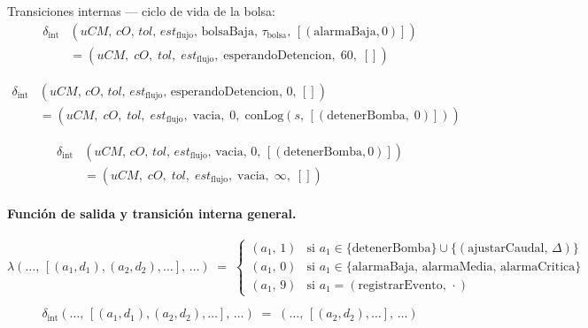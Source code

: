 Transiciones internas — ciclo de vida de la bolsa:
\begin{align*}
  \delta_{\mathrm{int}}&(uCM,\,cO,\,tol,\,est_{\mathrm{flujo}},\,
    \mathrm{bolsaBaja},\,\tau_{\mathrm{bolsa}},\,[(\mathrm{alarmaBaja},0)]) \\
  &= (uCM,\;cO,\;tol,\;est_{\mathrm{flujo}},\;
      \mathrm{esperandoDetencion},\;60,\;[])
\end{align*}

\begin{align*}
  \delta_{\mathrm{int}}&(uCM,\,cO,\,tol,\,est_{\mathrm{flujo}},\,
    \mathrm{esperandoDetencion},\,0,\,[]) \\
  &= (uCM,\;cO,\;tol,\;est_{\mathrm{flujo}},\;
      \mathrm{vacia},\;0,\;\mathrm{conLog}(s,\,[(\mathrm{detenerBomba},\;0)]))
\end{align*}

\begin{align*}
  \delta_{\mathrm{int}}&(uCM,\,cO,\,tol,\,est_{\mathrm{flujo}},\,
    \mathrm{vacia},\,0,\,[(\mathrm{detenerBomba},0)]) \\
  &= (uCM,\;cO,\;tol,\;est_{\mathrm{flujo}},\;
      \mathrm{vacia},\;\infty,\;[])
\end{align*}

\paragraph{Función de salida y transición interna general.}
\[
  \lambda(\ldots,\,[(a_1,d_1),(a_2,d_2),\ldots],\,\ldots) \;=\;
  \begin{cases}
    (a_1,\, 1) & \text{si } a_1 \in \{\mathrm{detenerBomba}\} \cup \{(\mathrm{ajustarCaudal},\,\Delta)\} \\
    (a_1,\, 0) & \text{si } a_1 \in \{\mathrm{alarmaBaja},\,\mathrm{alarmaMedia},\,\mathrm{alarmaCritica}\} \\
    (a_1,\, 9) & \text{si } a_1 = (\mathrm{registrarEvento},\, \cdot)
  \end{cases}
\]

\[
  \delta_{\mathrm{int}}(\ldots,\,[(a_1,d_1),(a_2,d_2),\ldots],\,\ldots)
  \;=\; (\ldots,\,[(a_2,d_2),\ldots],\,\ldots)
\]

